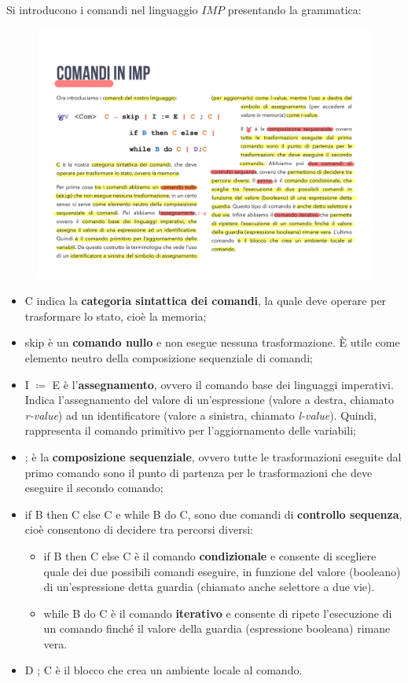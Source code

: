\documentclass[a4paper]{article}
\begin{document}
 	Si introducono i comandi nel linguaggio $IMP$ presentando la grammatica:
 	\begin{figure}[!htp]
 		\centering
 		\includegraphics[width=.7\textwidth]{img/comandi_imp.pdf}
 	\end{figure}
 	
 	\begin{itemize}
 		\item \textsf{C} indica la \textbf{categoria sintattica dei comandi}, la quale deve operare per trasformare lo stato, cioè la memoria;
 		
 		\item \textsf{skip} è un \textbf{comando nullo} e non esegue nessuna trasformazione. È utile come elemento neutro della composizione sequenziale di comandi;
 		
 		\item \textsf{I $\coloneq$ E} è l'\textbf{assegnamento}, ovvero il comando base dei linguaggi imperativi. Indica l'assegnamento del valore di un'espressione (valore a destra, chiamato \emph{r-value}) ad un identificatore (valore a sinistra, chiamato \emph{l-value}). Quindi, rappresenta il comando primitivo per l'aggiornamento delle variabili;
 		
 		\item \textsf{;} è la \textbf{composizione sequenziale}, ovvero tutte le trasformazioni eseguite dal primo comando sono il punto di partenza per le trasformazioni che deve eseguire il secondo comando;
 		
 		\item \textsf{if B then C else C} e \textsf{while B do C}, sono due comandi di \textbf{controllo sequenza}, cioè consentono di decidere tra percorsi diversi:
 		\begin{itemize}
 			\item \textsf{if B then C else C} è il comando \textbf{condizionale} e consente di scegliere quale dei due possibili comandi eseguire, in funzione del valore (booleano) di un'espressione detta guardia (chiamato anche selettore a due vie).
 			
 			\item \textsf{while B do C} è il comando \textbf{iterativo} e consente di ripete l'esecuzione di un comando finché il valore della guardia (espressione booleana) rimane vera.
 		\end{itemize}
 		
 		\item \textsf{D ; C} è il blocco che crea un ambiente locale al comando.
 	\end{itemize}\newpage
 	
\end{document}
